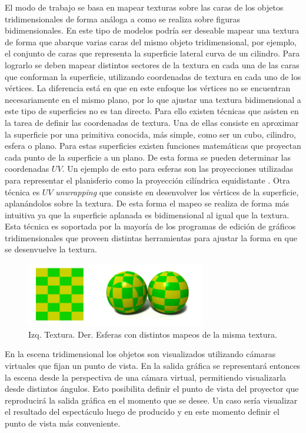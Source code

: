 El modo de trabajo se basa en mapear texturas sobre las caras de los objetos tridimensionales de forma análoga a como se realiza sobre figuras bidimensionales. En este tipo de modelos podría ser deseable mapear una textura de forma que abarque varias caras del mismo objeto tridimensional, por ejemplo, el conjunto de caras que representa la superficie lateral curva de un cilindro. Para lograrlo se deben mapear distintos sectores de la textura en cada una de las caras que conforman la superficie, utilizando coordenadas de textura en cada uno de los vértices. La diferencia está en que en este enfoque los vértices no se encuentran necesariamente en el mismo plano, por lo que ajustar una textura bidimensional a este tipo de superficies no es tan directo. Para ello existen técnicas que asisten en la tarea de definir las coordenadas de textura. Una de ellas consiste en aproximar la superficie por una primitiva conocida, más simple, como ser un cubo, cilindro, esfera o plano. Para estas superficies existen funciones matemáticas que proyectan cada punto de la superficie a un plano. De esta forma se pueden determinar las coordenadas $UV$. Un ejemplo de esto para esferas son las proyecciones utilizadas para representar el planisferio como la proyección cilíndrica equidistante \cite{flatteningTheEarth}. Otra técnica es $UV$ \emph{unwrapping} que consiste en desenvolver los vértices de la superficie, aplanándolos sobre la textura. De esta forma el mapeo se realiza de forma más intuitiva ya que la superficie aplanada es bidimensional al igual que la textura. Esta técnica es soportada por la mayoría de los programas de edición de gráficos tridimensionales que proveen distintas herramientas para ajustar la forma en que se desenvuelve la textura.

\begin{figure}[H]
  \centering
    \includegraphics[width=0.7\textwidth]{./Cap2_videomapping/3dmapping}
  \caption[Imagen propia.]{Izq. Textura. Der. Esferas con distintos mapeos de la misma textura.}
  \label{fig:3dmapping}
\end{figure}

En la escena tridimensional los objetos son visualizados utilizando cámaras virtuales que fijan un punto de vista. En la salida gráfica se representará entonces la escena desde la perspectiva de una cámara virtual, permitiendo visualizarla desde distintos ángulos. Esto posibilita definir el punto de vista del proyector que reproducirá la salida gráfica en el momento que se desee. Un caso sería visualizar el resultado del espectáculo luego de producido y en este momento definir el punto de vista más conveniente.

